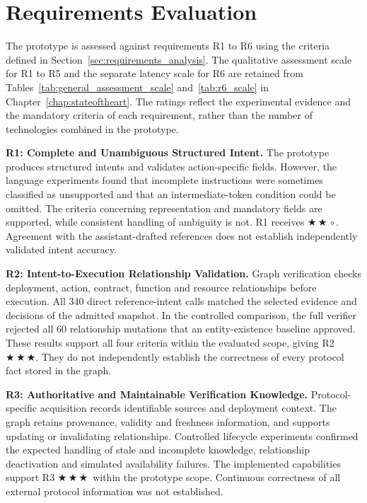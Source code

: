 \section{Requirements Evaluation}
\label{sec:requirements_evaluation}

The prototype is assessed against requirements R1 to R6 using the criteria defined
in Section~\ref{sec:requirements_analysis}. The qualitative assessment scale
for R1 to R5 and the separate latency scale for R6 are retained from
Tables~\ref{tab:general_assessment_scale} and~\ref{tab:r6_scale} in Chapter~\ref{chap:stateoftheart}. The ratings reflect the experimental evidence
and the mandatory criteria of each requirement, rather than the number of
technologies combined in the prototype.

\begingroup
\providecommand{\evThree}{\ensuremath{\bigstar\,\bigstar\,\bigstar}}
\providecommand{\evTwo}{\ensuremath{\bigstar\,\bigstar\,\circ}}
\providecommand{\evOne}{\ensuremath{\bigstar\,\circ\,\circ}}
\providecommand{\evZero}{\ensuremath{\circ\,\circ\,\circ}}

\noindent\textbf{R1: Complete and Unambiguous Structured Intent.}
The prototype produces structured intents and validates action-specific fields.
However, the language experiments found that incomplete instructions were
sometimes classified as unsupported and that an intermediate-token condition
could be omitted. The criteria concerning representation and mandatory fields
are supported, while consistent handling of ambiguity is not. R1 receives
\evTwo. Agreement with the assistant-drafted references does not establish
independently validated intent accuracy.

\medskip\noindent\textbf{R2: Intent-to-Execution Relationship Validation.}
Graph verification checks deployment, action, contract, function and resource
relationships before execution. All 340 direct reference-intent calls matched
the selected evidence and decisions of the admitted snapshot. In the controlled
comparison, the full verifier rejected all 60 relationship mutations that
an entity-existence baseline approved. These results support all four criteria
within the evaluated scope, giving R2 \evThree. They do not independently
establish the correctness of every protocol fact stored in the graph.

\medskip\noindent\textbf{R3: Authoritative and Maintainable Verification Knowledge.}
Protocol-specific acquisition records identifiable sources and deployment
context. The graph retains provenance, validity and freshness information,
and supports updating or invalidating relationships. Controlled lifecycle
experiments confirmed the expected handling of stale and incomplete knowledge,
relationship deactivation and simulated availability failures. The implemented
capabilities support R3 \evThree\ within the prototype scope. Continuous
correctness of all external protocol information was not established.


